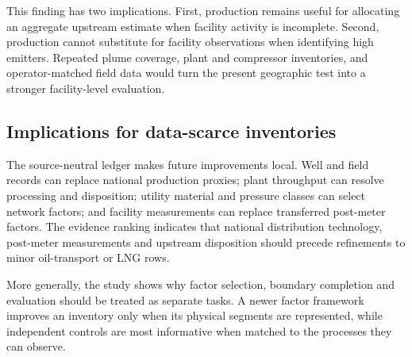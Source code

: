 This finding has two implications. First, production remains useful for allocating an aggregate
upstream estimate when facility activity is incomplete. Second, production cannot substitute
for facility observations when identifying high emitters. Repeated plume coverage, plant and
compressor inventories, and operator-matched field data would turn the present geographic test
into a stronger facility-level evaluation.

\subsection{Implications for data-scarce inventories}

The source-neutral ledger makes future improvements local. Well and field records can replace
national production proxies; plant throughput can resolve processing and disposition; utility
material and pressure classes can select network factors; and facility measurements can replace
transferred post-meter factors. The evidence ranking indicates that national distribution
technology, post-meter measurements and upstream disposition should precede refinements to minor
oil-transport or LNG rows.

More generally, the study shows why factor selection, boundary completion and evaluation should
be treated as separate tasks. A newer factor framework improves an inventory only when its
physical segments are represented, while independent controls are most informative when matched
to the processes they can observe.

